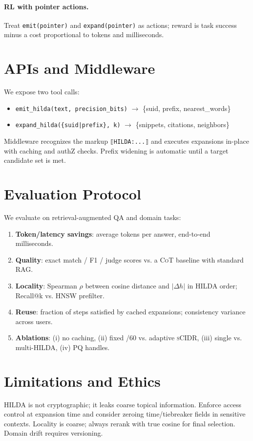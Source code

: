 \documentclass[11pt]{article}
\newcommand{\hilda}{\textsc{HILDA}}
\newcommand{\scidr}{\textsc{sCIDR}}
\newcommand{\pq}{\textsc{PQ}}
\newcommand{\cot}{\textsc{CoT}}
\begin{document}
\paragraph{RL with pointer actions.} Treat \texttt{emit(pointer)} and \texttt{expand(pointer)} as actions; reward is task success minus a cost proportional to tokens and milliseconds.

\section{APIs and Middleware}
We expose two tool calls:\vspace{-0.25em}
\begin{itemize}[leftmargin=*]
  \item \texttt{emit\_hilda(text, precision\_bits)} $\to$ \{suid, prefix, nearest\_words\}
  \item \texttt{expand\_hilda(\{suid|prefix\}, k)} $\to$ \{snippets, citations, neighbors\}
\end{itemize}
Middleware recognizes the markup \verb|⟦HILDA:...⟧| and executes expansions in-place with caching and authZ checks. Prefix widening is automatic until a target candidate set is met.

\section{Evaluation Protocol}
We evaluate on retrieval-augmented QA and domain tasks:\vspace{-0.25em}
\begin{enumerate}[leftmargin=*]
  \item \textbf{Token/latency savings}: average tokens per answer, end-to-end milliseconds.
  \item \textbf{Quality}: exact match / F1 / judge scores vs. a \cot{} baseline with standard RAG.
  \item \textbf{Locality}: Spearman $\rho$ between cosine distance and $|\Delta h|$ in \hilda{} order; Recall@k vs. HNSW prefilter.
  \item \textbf{Reuse}: fraction of steps satisfied by cached expansions; consistency variance across users.
  \item \textbf{Ablations}: (i) no caching, (ii) fixed /60 vs. adaptive \scidr{}, (iii) single vs. multi-\hilda{}, (iv) \pq{} handles.
\end{enumerate}

\section{Limitations and Ethics}
\hilda{} is not cryptographic; it leaks coarse topical information. Enforce access control at expansion time and consider zeroing time/tiebreaker fields in sensitive contexts. Locality is coarse; always rerank with true cosine for final selection. Domain drift requires versioning.
\end{document}
